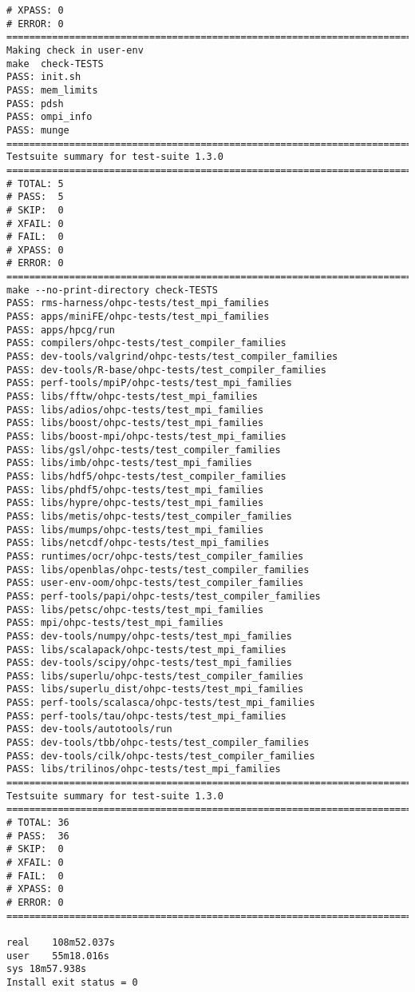 \begin{lstlisting}
# XPASS: 0
# ERROR: 0
============================================================================
Making check in user-env
make  check-TESTS
PASS: init.sh
PASS: mem_limits
PASS: pdsh
PASS: ompi_info
PASS: munge
============================================================================
Testsuite summary for test-suite 1.3.0
============================================================================
# TOTAL: 5
# PASS:  5
# SKIP:  0
# XFAIL: 0
# FAIL:  0
# XPASS: 0
# ERROR: 0
============================================================================
make --no-print-directory check-TESTS
PASS: rms-harness/ohpc-tests/test_mpi_families
PASS: apps/miniFE/ohpc-tests/test_mpi_families
PASS: apps/hpcg/run
PASS: compilers/ohpc-tests/test_compiler_families
PASS: dev-tools/valgrind/ohpc-tests/test_compiler_families
PASS: dev-tools/R-base/ohpc-tests/test_compiler_families
PASS: perf-tools/mpiP/ohpc-tests/test_mpi_families
PASS: libs/fftw/ohpc-tests/test_mpi_families
PASS: libs/adios/ohpc-tests/test_mpi_families
PASS: libs/boost/ohpc-tests/test_mpi_families
PASS: libs/boost-mpi/ohpc-tests/test_mpi_families
PASS: libs/gsl/ohpc-tests/test_compiler_families
PASS: libs/imb/ohpc-tests/test_mpi_families
PASS: libs/hdf5/ohpc-tests/test_compiler_families
PASS: libs/phdf5/ohpc-tests/test_mpi_families
PASS: libs/hypre/ohpc-tests/test_mpi_families
PASS: libs/metis/ohpc-tests/test_compiler_families
PASS: libs/mumps/ohpc-tests/test_mpi_families
PASS: libs/netcdf/ohpc-tests/test_mpi_families
PASS: runtimes/ocr/ohpc-tests/test_compiler_families
PASS: libs/openblas/ohpc-tests/test_compiler_families
PASS: user-env-oom/ohpc-tests/test_compiler_families
PASS: perf-tools/papi/ohpc-tests/test_compiler_families
PASS: libs/petsc/ohpc-tests/test_mpi_families
PASS: mpi/ohpc-tests/test_mpi_families
PASS: dev-tools/numpy/ohpc-tests/test_mpi_families
PASS: libs/scalapack/ohpc-tests/test_mpi_families
PASS: dev-tools/scipy/ohpc-tests/test_mpi_families
PASS: libs/superlu/ohpc-tests/test_compiler_families
PASS: libs/superlu_dist/ohpc-tests/test_mpi_families
PASS: perf-tools/scalasca/ohpc-tests/test_mpi_families
PASS: perf-tools/tau/ohpc-tests/test_mpi_families
PASS: dev-tools/autotools/run
PASS: dev-tools/tbb/ohpc-tests/test_compiler_families
PASS: dev-tools/cilk/ohpc-tests/test_compiler_families
PASS: libs/trilinos/ohpc-tests/test_mpi_families
============================================================================
Testsuite summary for test-suite 1.3.0
============================================================================
# TOTAL: 36
# PASS:  36
# SKIP:  0
# XFAIL: 0
# FAIL:  0
# XPASS: 0
# ERROR: 0
============================================================================

real    108m52.037s
user    55m18.016s
sys 18m57.938s
Install exit status = 0
\end{lstlisting}
